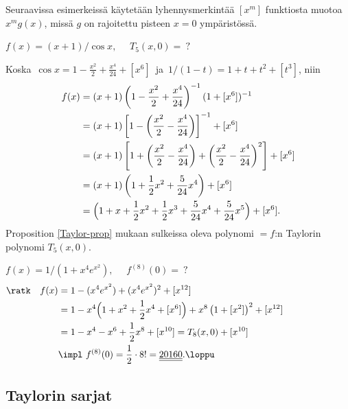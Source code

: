 Seuraavissa esimerkeissä käytetään lyhennysmerkintää $[x^m]$ funktiosta muotoa $x^m g(x)$, 
missä $g$ on rajoitettu pisteen $x=0$ ympäristössä.
\begin{Exa} \label{nopea Taylor 1}
$f(x)=(x+1)/\cos x,\quad$ $T_5(x,0)=\ ?$
\end{Exa}
\ratk Koska $\,\cos x=1-\frac{x^2}{2}+\frac{x^4}{24}+[x^6]\,$ ja
$\,1/(1-t)=1+t+t^2+[t^3]$, niin
\begin{align*}
f(x) &= (x+1)\left(1-\frac{x^2}{2}+\frac{x^4}{24}\right)^{-1}(1+[x^6])^{-1} \\
     &= (x+1)\left[1-\left(\frac{x^2}{2}-\frac{x^4}{24}\right)\right]^{-1}+[x^6] \\
     &= (x+1)\left[1+\left(\frac{x^2}{2}-\frac{x^4}{24}\right)
                    +\left(\frac{x^2}{2}-\frac{x^4}{24}\right)^2\right]+[x^6] \\ 
     &= (x+1)\left(1+\frac{1}{2}x^2+\frac{5}{24}x^4\right)+[x^6] \\
     &= \Bigl(1+x+\frac{1}{2}x^2+\frac{1}{2}x^3+\frac{5}{24}x^4+\frac{5}{24}x^5\Bigr)+[x^6].
\end{align*}
Proposition \ref{Taylor-prop} mukaan sulkeissa oleva polynomi $=f$:n Taylorin polynomi 
$T_5(x,0)$. \loppu
\begin{Exa} \label{nopea Taylor 2}
$f(x)=1/(1+x^4e^{x^2}),\quad$ $f^{(8)}(0)=\ ?$
\begin{align*}
\text{\ratk} \quad f(x) &= 1-(x^4e^{x^2})+(x^4e^{x^2})^2+[x^{12}] \hspace{6cm} \\
                        &= 1-x^4\Bigl(1+x^2+\frac{1}{2}x^4+[x^6]\Bigr)
                                           +x^8\left(1+[x^2]\right)^2+[x^{12}] \\
                        &= 1-x^4-x^6+\frac{1}{2}x^8+[x^{10}] = T_8(x,0)+[x^{10}] \\
                        &\impl \ f^{(8)}(0) = \frac{1}{2}\cdot8!=\underline{\underline{20160}}.
                                                                                       \loppu
\end{align*}
\end{Exa}

\subsection{Taylorin sarjat}

